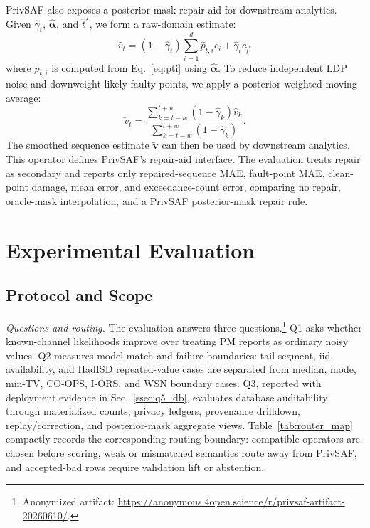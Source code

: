\documentclass[conference]{IEEEtran}
\begin{document}
PrivSAF also exposes a posterior-mask repair aid for downstream analytics. Given \(\hat\gamma_t\), \(\hat{\boldsymbol{\alpha}}\), and \(\hat t^\star\), we form a raw-domain estimate:
\begin{equation}
\hat v_t
=
(1-\hat\gamma_t)\sum_{i=1}^{d}\hat p_{t,i}c_i
+
\hat\gamma_t c_{\hat t^\star}
\label{eq:raw-est}
\end{equation}
where \(\hat p_{t,i}\) is computed from Eq.~\eqref{eq:pti} using \(\hat{\boldsymbol{\alpha}}\). To reduce independent LDP noise and downweight likely faulty points, we apply a posterior-weighted moving average:
\begin{equation}
\tilde v_t
=
\frac{\sum_{k=t-w}^{t+w}(1-\hat\gamma_k)\hat v_k}
{\sum_{k=t-w}^{t+w}(1-\hat\gamma_k)}.
\label{eq:smooth}
\end{equation}
The smoothed sequence estimate \(\tilde{\mathbf{v}}\) can then be used by downstream analytics. This operator defines PrivSAF's repair-aid interface. The evaluation treats repair as secondary and reports only repaired-sequence MAE, fault-point MAE, clean-point damage, mean error, and exceedance-count error, comparing no repair, oracle-mask interpolation, and a PrivSAF posterior-mask repair rule.

\section{Experimental Evaluation}
\label{sec:experimental}

\subsection{Protocol and Scope}
\label{ssec:overview}

\noindent\emph{Questions and routing.}
The evaluation answers three questions.\footnote{Anonymized artifact: \url{https://anonymous.4open.science/r/privsaf-artifact-20260610/}.} Q1 asks whether known-channel likelihoods improve over treating PM reports as ordinary noisy values. Q2 measures model-match and failure boundaries: tail segment, iid, availability, and HadISD repeated-value cases are separated from median, mode, min-TV, CO-OPS, I-ORS, and WSN boundary cases. Q3, reported with deployment evidence in Sec.~\ref{ssec:q5_db}, evaluates database auditability through materialized counts, privacy ledgers, provenance drilldown, replay/correction, and posterior-mask aggregate views. Table~\ref{tab:router_map} compactly records the corresponding routing boundary: compatible operators are chosen before scoring, weak or mismatched semantics route away from PrivSAF, and accepted-bad rows require validation lift or abstention.
\end{document}
